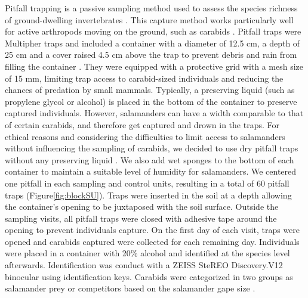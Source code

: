 Pitfall trapping is a passive sampling method used to assess the species richness of ground-dwelling invertebrates \citep{knappEffectPitfallTrap2012,kotzeFortyYearsCarabid2011a,loveiEcologyBehaviorGround1996}.
This capture method works particularly well for active arthropods moving on the ground, such as carabids \citep{baarsCatchesPitfallTraps1979,loveiEcologyBehaviorGround1996,spenceSamplingCarabidAssemblages1994a}. 
Pitfall traps were Multipher\up{\textregistered{}} traps and included a container with a diameter of 12.5 cm, a depth of 25 cm and a cover raised 4.5 cm above the trap 
to prevent debris and rain from filling the container \citep{bouchardBeetleCommunityResponse2016b,mooreEffectsTwoSilvicultural2004}.
They were equipped with a protective grid with a mesh size of 15 mm, limiting trap access to carabid-sized individuals and reducing the chances of predation by small mammals. 
Typically, a preserving liquid (such as propylene glycol or alcohol) is placed in the bottom of the container to preserve captured individuals. 
However, salamanders can have a width comparable to that of certain carabids, and therefore get captured and drown in the traps. 
For ethical reasons and considering the difficulties to limit access to salamanders without influencing the sampling of carabids, we decided to use dry pitfall traps without any preserving liquid \citep{luffFeaturesInfluencingEfficiency1975}. 
We also add wet sponges to the bottom of each container to maintain a suitable level of humidity for salamanders.
We centered one pitfall in each sampling and control units, resulting in a total of 60 pitfall traps (Figure\ref{fig:blockSU}). 
Traps were inserted in the soil at a depth allowing the container's opening to be juxtaposed with the soil surface. 
Outside the sampling visits, all pitfall traps were closed with adhesive tape around the opening to prevent individuals capture. 
On the first day of each visit, traps were opened and carabids captured were collected for each remaining day. 
Individuals were placed in a container with 20\% alcohol and identified at the species level afterwards.
Identification was conduct with a ZEISS SteREO Discovery.V12 binocular using \cite{larochelleManuelIdentificationCarabidae1976} identification keys.
Carabids were categorized in two groups as salamander prey or competitors based on the salamander gape size \citep{jaegerFoodLimitedResource1972,magliaModulationPreycaptureBehavior1995,magliaOntogenyFeedingEcology1996}.

